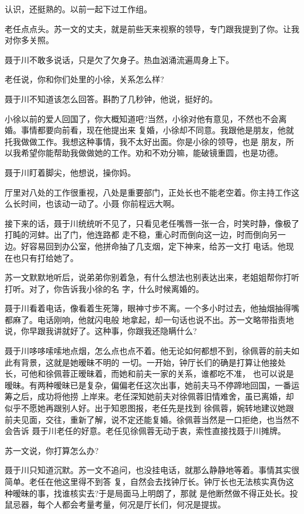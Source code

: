 \documentclass[11pt,a4paper,onecolumn]{article}
\begin{document}
认识，还挺熟的。以前一起下过工作组。

老任点点头。苏一文的丈夫，就是前些天来视察的领导，专门跟我提到了你。让我对你多关照。

聂于川不敢多说话，只是欠了欠身子。热血汹涌流遍周身上下。

老任说，你和你们处里的小徐，关系怎么样?

聂于川不知道该怎么回答。斟酌了几秒钟，他说，挺好的。

小徐以前的爱人回国了，你大概知道吧?当然，小徐对他有意见，不然也不会离婚。事情都要向前看，现在他提出来
复婚，小徐却不同意。我跟他是朋友，他就托我做做工作。我想这种事情，我不太好出面。你是小徐的领导，也是
朋友，所以我希望你能帮助我做做她的工作。劝和不劝分嘛，能破镜重圆，也是功德。

聂于川盯着脚尖，他想说，操你妈。

厅里对八处的工作很重视，八处是重要部门，正处长也不能老空着。你主持工作这么长时间，也该动一动了。小聂
你前程远大啊。

接下来的话，聂于川统统听不见了，只看见老任嘴唇一张一合，时笑时静，像极了打盹的河蚌。出了门，他连路都
走不稳，重心时而倒向这一边，时而倒向另一边。好容易回到办公室，他拼命抽了几支烟，定下神来，给苏一文打
电话。他现在也只有打给她了。

苏一文默默地听后，说弟弟你别着急，有什么想法也别表达出来，老姐姐帮你打听打听。对了，你告诉我小徐的名
字，什么时候离婚的。

聂于川看着电话，像看着生死簿，眼神寸步不离。一个多小时过去，他抽烟抽得嘴都麻了。电话刚响，他就闪电般
地拿起，却一句话也说不出。苏一文略带指责地说，你早跟我讲就好了。这种事，你跟我还隐瞒什么?

聂于川哆哆嗦嗦地点烟，怎么点也点不着。他无论如何都想不到，徐佩蓉的前夫如此有背景，这就是她暧昧不明的
一切。一开始，钟厅长们的确是打算让他接处长，可他和徐佩蓉正暧昧着，而她和前夫一家的关系，谁都吃不准，
也可以说是暧昧。有两种暧昧已是复杂，偏偏老任这次出事，她前夫马不停蹄地回国，一番运筹之后，成功将他捞
上岸来。老任深知她前夫对徐佩蓉旧情难舍，虽已离婚，却似乎不愿她再跟别人好。出于知恩图报，老任先是找到
徐佩蓉，婉转地建议她跟前夫见面，交往，重新了解，说不定还能复婚。徐佩蓉当然是一口拒绝，也当然不会告诉
聂于川老任的好意。老任见徐佩蓉无动于衷，索性直接找聂于川摊牌。

苏一文说，你打算怎么办?

聂于川只知道沉默。苏一文不追问，也没挂电话，就那么静静地等着。事情其实很简单。老任在他这里得不到答
复，自然会去找钟厅长。钟厅长也无法核实真伪\myrule{}这种暧昧的事，找谁核实去?于是局面马上明朗了，那就
是他断然做不得正处长。投鼠忌器，每个人都会考量考量，何况是厅长们，何况是提拔。
\end{document}
